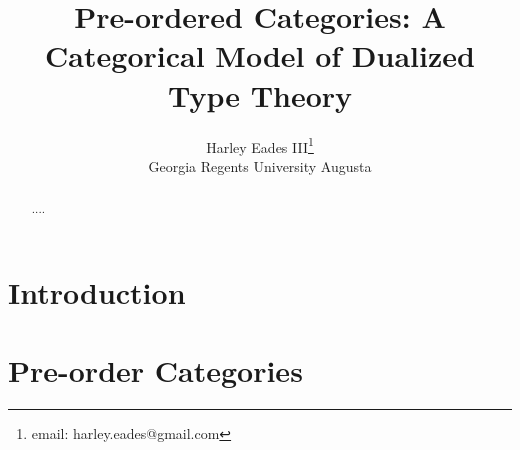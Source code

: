 \documentclass{article}
\title{Pre-ordered Categories: A Categorical Model of Dualized Type Theory}
\author{Harley Eades III\footnote{email: harley.eades@gmail.com}\\ Georgia Regents University Augusta}
\date{}
\begin{document}
\maketitle  

\begin{abstract}
  ....
\end{abstract}

\section{Introduction}
\label{sec:introduction}


\section{Pre-order Categories}
\label{sec:po-cats}
\end{document}
